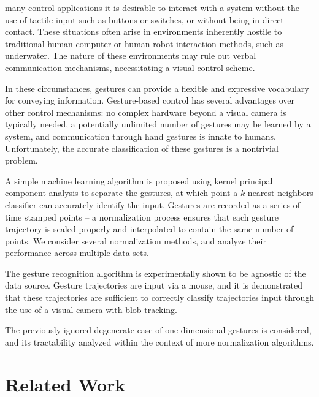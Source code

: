 \documentclass[12pt,journal,compsoc]{IEEEtran}
\begin{document}
 many control applications it is desirable to
interact with a system without the use of tactile input such as buttons
or switches, or without being in direct contact. These situations often
arise in environments inherently hostile to traditional human-computer or
human-robot interaction methods, such as underwater. The nature of these
environments may rule out verbal communication mechanisms, necessitating
a visual control scheme. 
\par
In these circumstances, gestures can provide a flexible and expressive
vocabulary for conveying information. Gesture-based control has several
advantages over other control mechanisms: no complex hardware beyond a visual
camera is typically needed, a potentially unlimited number of gestures may
be learned by a system, and communication through hand gestures is innate
to humans. Unfortunately, the accurate classification of these gestures is
a nontrivial problem.
\par 
A simple machine learning algorithm is proposed using kernel principal
component analysis to separate the gestures, at which point a
$k$-nearest neighbors classifier can accurately identify the input.
Gestures are recorded as a series of time stamped points -- a normalization
process ensures that each gesture trajectory is scaled properly and interpolated
to contain the same number of points. We consider several normalization methods,
and analyze their performance across multiple data sets.
\par
The gesture recognition algorithm is experimentally shown to be agnostic of the
data source. Gesture trajectories are input via a mouse, and it is demonstrated
that these trajectories are sufficient to correctly classify trajectories input
through the use of a visual camera with blob tracking.
\par
The previously ignored degenerate case of one-dimensional gestures is considered,
and its tractability analyzed within the context of more normalization algorithms.


\section{Related Work} \label{relatedwork}
\end{document}
